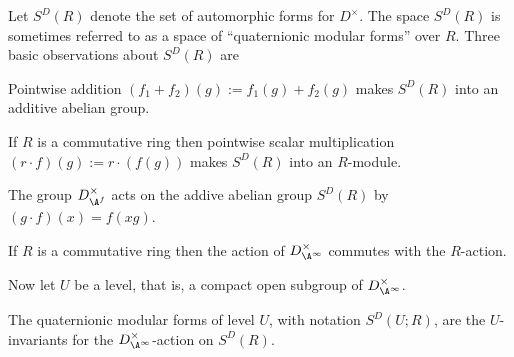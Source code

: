Let $S^D(R)$ denote the set of automorphic forms for $D^\times$. The space $S^D(R)$ is sometimes referred to as a space of
``quaternionic modular forms'' over $R$.
Three basic observations about $S^D(R)$ are

\begin{definition}
  \label{TotallyDefiniteQuaternionAlgebra.WeightTwoAutomorphicForm.addCommGroup}
  \leanok
  Pointwise addition $(f_1+f_2)(g):=f_1(g)+f_2(g)$ makes $S^D(R)$ into an
  additive abelian group.
\end{definition}

\begin{definition}
  \label{TotallyDefiniteQuaternionAlgebra.WeightTwoAutomorphicForm.module}
  \leanok
  If $R$ is a commutative ring then pointwise scalar multiplication $(r\cdot f)(g):= r\cdot(f(g))$ makes
  $S^D(R)$ into an $R$-module.
\end{definition}

\begin{definition}
  \label{TotallyDefiniteQuaternionAlgebra.WeightTwoAutomorphicForm.distribMulAction}
  \leanok
  The group $D_{\A^f}^\times$ acts on the addive abelian group $S^D(R)$ by $(g\cdot f)(x)=f(xg)$.
\end{definition}

If $R$ is a commutative ring then the action of $D_{\A^\infty}^\times$ commutes with the $R$-action.

Now let $U$ be a level, that is, a compact open subgroup of $D_{\A^\infty}^\times$.

\begin{definition}
  \label{TotallyDefiniteQuaternionAlgebra.WeightTwoAutomorphicFormOfLevel}
  \leanok
  The quaternionic modular forms of level $U$, with notation $S^D(U;R)$, are the $U$-invariants for the $D_{\A^\infty}^\times$-action on $S^D(R)$.
\end{definition}

